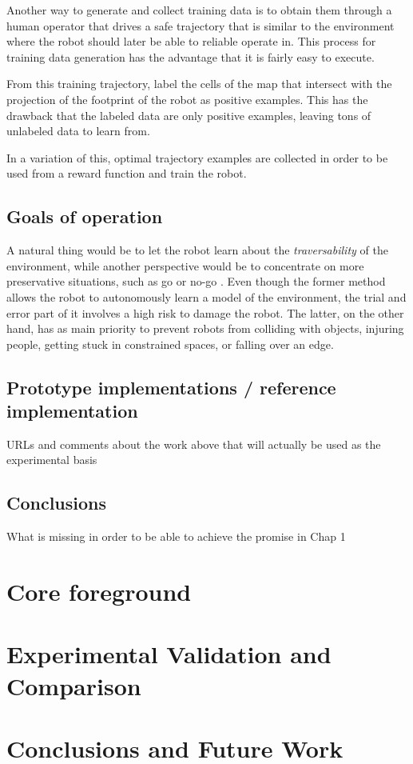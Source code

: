 \documentclass[12pt,a4paper]{report}
\newcommand{\term}{\textit}
\begin{document}
	
	
	Another way to generate and collect training data is to obtain them through 
	a human operator that drives a safe trajectory that is similar to the 
	environment where the robot should later be able to reliable operate in. 
	This process for training data generation has the advantage that it is fairly 
	easy to execute.
	\par 
	From this training trajectory, \cite{Suger} label the cells of the map that 
	intersect with the projection of the footprint of the robot as positive 
	examples. This has the drawback that the labeled data are only positive 
	examples, leaving tons of unlabeled data to learn from.
	\par 
	In a variation of this, optimal trajectory examples are collected \cite{Wigness} 
	in order to be used from a reward function and train the robot.
	
	\section{Goals of operation}
	\label{sec:bg:goals}
	
	A natural thing would be to let the robot learn about the \term{traversability} 
	of the environment, while another perspective would be to concentrate on more 
	preservative situations, such as go or no-go \cite{Hirose}. Even though the 
	former method allows the robot to autonomously learn a model of the environment, 
	the trial and error part of it involves a high risk to damage the robot. The 
	latter, on the other hand, has as main priority to prevent robots from 
	colliding with objects, injuring people, getting stuck in constrained spaces, 
	or falling over an edge.
	\\
	
	\section{Prototype implementations / reference implementation}
	\label{sec:bg:code}
	
	URLs and comments about the work above that will actually be used as 
	the experimental basis
	\\
		
	\section{Conclusions}
	\label{sec:bg:concl}
	
	What is missing in order to be able to achieve the promise in Chap 1
	
	
	\chapter{Core foreground}
	\label{sec:fg}
	
	\chapter{Experimental Validation and Comparison}
	\label{sec:exp}
	
	\chapter{Conclusions and Future Work}
	\label{sec:concl}
	
	\renewcommand{\bibname}{References}
	
	
\end{document}
